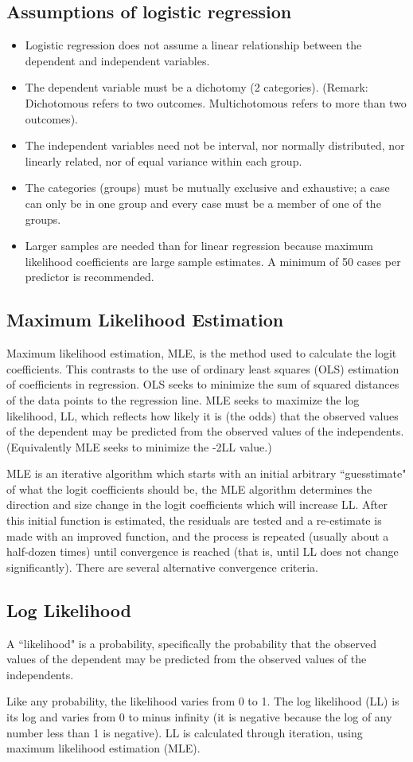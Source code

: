 \documentclass[a4paper,12pt]{article}
\begin{document}
\subsection{Assumptions of logistic regression}
\begin{itemize}
\item Logistic regression does not assume a linear relationship between the dependent and
independent variables.
\item The dependent variable must be a dichotomy (2 categories).
(Remark: Dichotomous refers to two outcomes. Multichotomous refers to more than two outcomes).
\item The independent variables need not be interval, nor normally distributed, nor linearly
related, nor of equal variance within each group.
\item The categories (groups) must be mutually exclusive and exhaustive; a case can only be
in one group and every case must be a member of one of the groups.
\item Larger samples are needed than for linear regression because maximum likelihood
coefficients are large sample estimates. A minimum of 50 cases per predictor is
recommended.
\end{itemize}
\subsection{Maximum Likelihood Estimation}
Maximum likelihood estimation, MLE, is the method used to calculate the logit coefficients. This contrasts to the use of ordinary least squares (OLS) estimation of coefficients in regression. OLS seeks to minimize the sum of squared distances of the data points to the regression line. MLE seeks to maximize the log likelihood, LL, which reflects how likely it is (the odds) that the observed values of the dependent may be predicted from the observed values of the independents. (Equivalently MLE seeks to minimize the -2LL value.)

MLE is an iterative algorithm which starts with an initial arbitrary ``guesstimate" of what the logit coefficients should be, the MLE algorithm determines the direction and size change in the logit coefficients which will increase LL. After this initial function is estimated, the residuals are tested and a re-estimate is made with an improved function, and the process is repeated (usually about a half-dozen times) until convergence is reached (that is, until LL does not change significantly). There are several alternative convergence criteria.


\subsection{Log Likelihood}
A ``likelihood" is a probability, specifically the probability that the observed values of the dependent may be predicted from the observed values of the independents. 

Like any probability, the likelihood varies from 0 to 1. The log likelihood (LL) is its log and varies from 0 to minus infinity (it is negative because the log of any number less than 1 is negative). LL is calculated through iteration, using maximum likelihood estimation (MLE).
\end{document}
